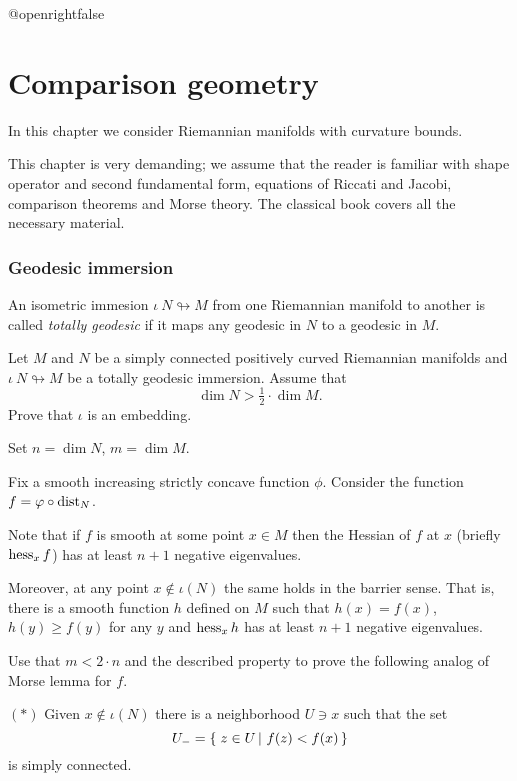 \csname @openrightfalse\endcsname
\chapter{Comparison geometry}

In this chapter we consider Riemannian manifolds with curvature bounds.

This chapter is very demanding;
we assume that the reader is familiar with   
shape operator and second fundamental form, 
equations of Riccati and Jacobi,
comparison theorems and Morse theory.
The classical book \cite{cheeger-ebin} covers all the  necessary  material.

\subsection*{Geodesic immersion\hard}
\label{Geodesic immersion}

An isometric immesion $\iota\:N\looparrowright M$ from one Riemannian manifold to another is called \emph{totally geodesic} if it maps any geodesic in $N$ to a geodesic in $M$.

\begin{pr}
Let $M$ and $N$ be a simply connected positively curved Riemannian manifolds and $\iota\:N\looparrowright M$ be a totally geodesic immersion.
Assume that 
\[\dim N>\tfrac 12\cdot \dim M.\]
Prove that $\iota$ is an embedding.
\end{pr}

Set $n=\dim N$, $m=\dim M$.

Fix a smooth increasing strictly concave function $\phi$.
Consider the function $f=\varphi\circ\operatorname{\rm dist}\nolimits_N$.

Note that if $f$ is smooth at some point $x\in M$ 
then the Hessian of $f$ at $x$ (briefly $\operatorname{\rm hess}\nolimits_xf$)
has at least $n+1$ negative eigenvalues.

Moreover, at any point $x\notin \iota(N)$ the same holds in the barrier sense\label{page:barrier sense}.
That is, there is a smooth function $h$ defined on $M$
such that $h(x)=f(x)$, $h(y)\ge f(y)$ for any $y$
and $\operatorname{\rm hess}\nolimits_xh$ has at least $n+1$ negative eigenvalues.

Use that $m< 2\cdot n$ and the described property to prove the following
analog of Morse lemma for $f$.

\begin{cl}{$({*})$}
 Given $x\notin \iota(N)$ there is a neighborhood $U\ni x$ such that the set 
\[U_-=\set{z\in U}{f(z)<f(x)}\] is simply connected.
\end{cl}

